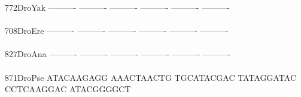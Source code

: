 \documentclass[11pt,twoside,reqno,a4paper]{article}
\begin{document}
{772\hspace*{2\charwidth}DroYak	----------	----------	----------	----------	----------	----------	\\
\hspace*{5\charwidth}\hspace*{7\charwidth}\hspace*{1\charwidth}\hspace*{1\charwidth}\hspace*{1\charwidth}\hspace*{1\charwidth}\hspace*{1\charwidth}\hspace*{1\charwidth}\\
708\hspace*{2\charwidth}DroEre	----------	----------	----------	----------	----------	----------	\\
\hspace*{5\charwidth}\hspace*{7\charwidth}\hspace*{1\charwidth}\hspace*{1\charwidth}\hspace*{1\charwidth}\hspace*{1\charwidth}\hspace*{1\charwidth}\hspace*{1\charwidth}\\
827\hspace*{2\charwidth}DroAna	----------	----------	----------	----------	----------	----------	\\
\hspace*{5\charwidth}\hspace*{7\charwidth}\hspace*{1\charwidth}\hspace*{1\charwidth}\hspace*{1\charwidth}\hspace*{1\charwidth}\hspace*{1\charwidth}\hspace*{1\charwidth}\\
871\hspace*{2\charwidth}DroPse	ATACAAGAGG	AAACTAACTG	TGCATACGAC	TATAGGATAC	CCTCAAGGAC	ATACGGGGCT	\\
\hspace*{5\charwidth}\hspace*{7\charwidth}\hspace*{1\charwidth}\hspace*{1\charwidth}\hspace*{1\charwidth}\hspace*{1\charwidth}\hspace*{1\charwidth}\hspace*{1\charwidth}\\
}
\end{document}
